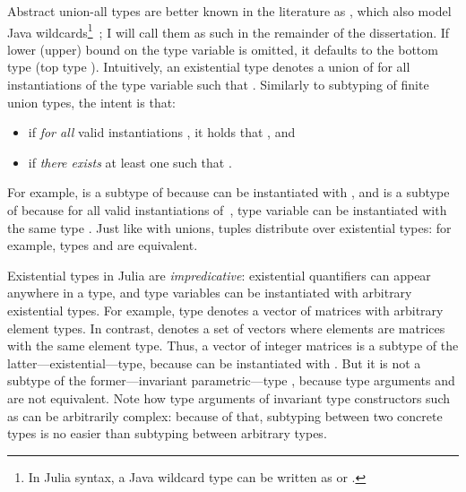 Abstract union-all types  are better known
in the literature as , which also model
Java wildcards\footnote{In Julia syntax, a Java wildcard type
 can be written as 
or .}~\cite{bib:torgersen:wildcards:2004};
I will call them as such in the remainder of the dissertation.
If lower (upper) bound on the type variable is omitted, it defaults to the
bottom type  (top type ).
Intuitively, an existential type denotes a union of  for all
instantiations of the type variable  such that .
Similarly to subtyping of finite union types, the intent is that:
\begin{itemize}
  \item {} if \emph{for all} valid instantiations
    , it holds that , and
  \item {} if \emph{there exists} at least one 
     such that .
\end{itemize}
For example,  is a subtype of  because  can be instantiated with ,
and  is a subtype of
 because for all valid instantiations  of~,
type variable  can be instantiated with the same type .
Just like with unions, tuples distribute over existential types:
for example, types 
and  are equivalent.

Existential types in Julia are \emph{impredicative}:
existential quantifiers can appear anywhere in a type,
and type variables can be instantiated with arbitrary existential types.
For example, type  denotes a vector
of matrices with arbitrary element types.
In contrast,  denotes a set of vectors where
elements are matrices with the same element type.
Thus, a vector of integer matrices  is a subtype
of the latter---existential---type, because  can be instantiated with
. But it is not a subtype of the former---invariant parametric---type
, because type arguments 
and  are not equivalent.
Note how type arguments of invariant type constructors such as 
can be arbitrarily complex: because of that, subtyping between two
concrete types is no easier than subtyping between arbitrary types.

